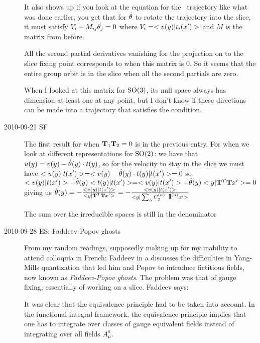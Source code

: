 \begin{description}
It also shows up if you look at the equation for the \reducedsp\ trajectory like what was done earlier, you get that for $\dot{{\bf \theta}}$ to rotate the trajectory into the slice, it must satisfy $V_i-M_{ij}\dot{{\bf \theta}_j}=0$ where $V_i=<v(y)|t_i(x')>$ and $M$ is the matrix from before.

All the second partial derivatives vanishing for the projection on to the slice fixing point corresponds to when this matrix is 0. So it seems that the entire group orbit is in the slice when all the second partials are zero.

When I looked at this matrix for $\textrm{SO}(3)$, its null space always has dimension at least one at any point, but I don't know if these directions can be made into a trajectory that satisfies the condition.

\item[2010-09-21 SF]
The first result for when $\mathbf{T}_1 \mathbf{T}_2=0$ is in the previous entry.
For when we look at different representations for $\textrm{SO}(2)$: we have that $u(y) = v(y)-\dot{{\bf \theta}}(y) \cdot t(y)$, so for the velocity to stay in the slice we must have $<u(y)|t(x')>=<v(y)-\dot{{\bf \theta}}(y) \cdot t(y)|t(x')>=0$ so $<v(y)|t(x')>-\dot{{\bf \theta}}(y)<t(y)|t(x')>=
<v(y)|t(x')>+\dot{{\bf \theta}}(y)<y|{\mathbf{T}}^T \mathbf{T} x'>=0$ giving us
$\dot{{\bf \theta}}(y)=-\frac{<v(y)|t(x')>}{<y|{\mathbf{T}}^T \mathbf{T} x'>}=-\frac{<v(y)|t(x')>}{<y|\sum_\alpha C_2^{(\alpha)} \, {\ \hbox{{\rm 1}\kern-.6em\hbox{\rm 1}}}^{(\alpha)} x'>}$

The sum over the irreducible spaces is still in the denominator

\item[2010-09-28 ES: Faddeev-Popov ghosts]

From my random readings, supposedly making up for my inability to attend colloquia in
French: Faddeev in a 
discusses the difficulties in Yang-Mills quantization that led him and Popov to introduce fictitious fields, now
known as \emph{Faddeev-Popov ghosts}. The problem was that of gauge fixing, essentially of working on a slice.
Faddeev says:

\begin{ttfamily}
It was clear that the equivalence principle had to be taken into account.
In the functional integral framework, the equivalence principle
implies that one has to integrate over classes of gauge equivalent fields
instead of integrating over all fields $A_\mu^a$.


\end{ttfamily}
\end{description}
